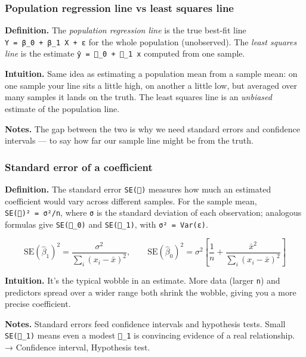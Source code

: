 \documentclass[
  10pt,
  letterpaper,
  onecolumn]{article}
\begin{document}
\hypertarget{population-regression-line-vs-least-squares-line}{%
\subsubsection{Population regression line vs least squares
line}\label{population-regression-line-vs-least-squares-line}}

\textbf{Definition.} The \emph{population regression line} is the true
best-fit line \texttt{Y\ =\ β\_0\ +\ β\_1\ X\ +\ ε} for the whole
population (unobserved). The \emph{least squares line} is the estimate
\texttt{ŷ\ =\ \_0\ +\ \_1\ x} computed from one sample.

\textbf{Intuition.} Same idea as estimating a population mean from a
sample mean: on one sample your line sits a little high, on another a
little low, but averaged over many samples it lands on the truth. The
least squares line is an \emph{unbiased} estimate of the population
line.

\textbf{Notes.} The gap between the two is why we need standard errors
and confidence intervals --- to say how far our sample line might be
from the truth.

\hypertarget{standard-error-of-a-coefficient}{%
\subsubsection{Standard error of a
coefficient}\label{standard-error-of-a-coefficient}}

\textbf{Definition.} The standard error \texttt{SE()} measures how much
an estimated coefficient would vary across different samples. For the
sample mean, \texttt{SE()²\ =\ σ²/n}, where \texttt{σ} is the standard
deviation of each observation; analogous formulas give \texttt{SE(\_0)}
and \texttt{SE(\_1)}, with \texttt{σ²\ =\ Var(ε)}.

\begin{equation*}
\mathrm{SE}(\hat\beta_1)^2=\frac{\sigma^2}{\sum_i (x_i-\bar x)^2},
\qquad
\mathrm{SE}(\hat\beta_0)^2=\sigma^2\left[\frac{1}{n}+\frac{\bar x^2}{\sum_i (x_i-\bar x)^2}\right]
\end{equation*}

\textbf{Intuition.} It's the typical wobble in an estimate. More data
(larger \texttt{n}) and predictors spread over a wider range both shrink
the wobble, giving you a more precise coefficient.

\textbf{Notes.} Standard errors feed confidence intervals and hypothesis
tests. Small \texttt{SE(\_1)} means even a modest \texttt{\_1} is
convincing evidence of a real relationship. → Confidence interval,
Hypothesis test.
\end{document}

